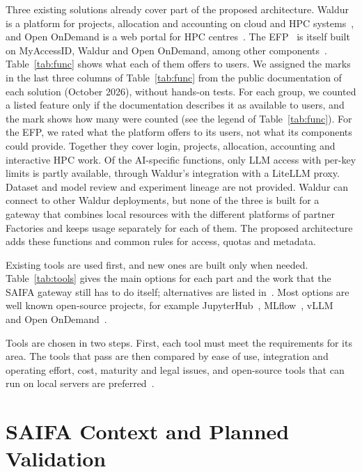 \documentclass[conference,a4paper]{IEEEtran}
\newif\ifizmene
\DeclareRobustCommand{\chg}[1]{\ifizmene{\color{blue}#1}\else#1\fi}
\DeclareRobustCommand{\roz}[1]{\ifizmene{\color{roze}#1}\else#1\fi}
\DeclareRobustCommand{\nov}[1]{\ifizmene{\color{nova}#1}\else#1\fi}
\DeclareRobustCommand{\tri}[1]{\ifizmene{\color{treca}#1}\else#1\fi}
\begin{document}
\chg{Three existing solutions already cover part of the} \nov{proposed architecture}\roz{. Waldur is a platform for projects, allocation and accounting on cloud and HPC systems}~\cite{waldur_docs}\roz{, and Open OnDemand is a web portal for HPC centres}~\cite{hudak2018ood}. \roz{The EFP}~\cite{eurohpc_efp} \roz{is itself built on MyAccessID, Waldur and Open OnDemand}\nov{, among other components}~\cite{nortamo2025efp}. \roz{Table~\ref{tab:func} shows what each of them offers to users.} \nov{We assigned the marks \tri{in the last three columns of Table~\ref{tab:func}} from the public documentation of each solution (October 2026), without hands-on tests. For each group, we counted a listed feature only if the documentation describes it as available to users, and the mark shows how many were counted (see the legend of Table~\ref{tab:func}). For the EFP, we rated what the platform offers to its users, not what its components could provide.} \nov{Together they cover login, projects, allocation, accounting and interactive HPC work.} \nov{Of the AI-specific functions, only LLM access with per-key limits is partly available, \tri{through Waldur's integration with a LiteLLM proxy. Dataset} and model review and experiment lineage are not provided. Waldur can connect to other Waldur deployments, but none of the three is built for a gateway that combines local resources with the different platforms of partner Factories and keeps usage separately for each of them. The proposed architecture adds these functions and common rules for access, quotas and metadata.}

\chg{Existing tools are used first, and new ones are built only when needed.} Table~\ref{tab:tools} gives the main \roz{options} for each part and the work that \nov{the SAIFA} gateway still has to do itself\chg{; alternatives are listed in~\cite{saifa_d31}}. Most options are well known open-source projects, for example JupyterHub~\cite{kluyver2016jupyter,jupyterhub_docs}, MLflow~\cite{zaharia2018mlflow}, vLLM~\cite{kwon2023vllm} and Open OnDemand~\cite{hudak2018ood}.

Tools are chosen in two steps\nov{. \tri{First,} each tool must meet the requirements for its area. \tri{The tools} that pass are \tri{then} compared by ease of use, integration and operating effort, cost, maturity and legal issues, \tri{and open-source tools that can run on local servers are preferred}~\cite{saifa_d31}}.

\section{\nov{SAIFA Context and Planned Validation}}
\label{sec:saifa}
\end{document}
